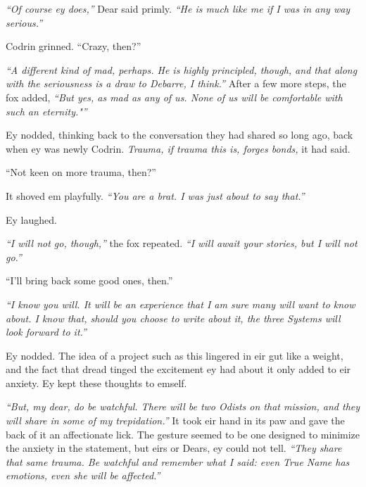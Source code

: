 \emph{``Of course ey does,''} Dear said primly. \emph{``He is much like me if I was in any way serious.''}

Codrin grinned. ``Crazy, then?''

\emph{``A different kind of mad, perhaps. He is highly principled, though, and that along with the seriousness is a draw to Debarre, I think.''} After a few more steps, the fox added, \emph{``But yes, as mad as any of us. None of us will be comfortable with such an eternity."''}

Ey nodded, thinking back to the conversation they had shared so long ago, back when ey was newly Codrin. \emph{Trauma, if trauma this is, forges bonds,} it had said.

``Not keen on more trauma, then?''

It shoved em playfully. \emph{``You are a brat. I was just about to say that.''}

Ey laughed.

\emph{``I will not go, though,''} the fox repeated. \emph{``I will await your stories, but I will not go.''}

``I'll bring back some good ones, then.''

\emph{``I know you will. It will be an experience that I am sure many will want to know about. I know that, should you choose to write about it, the three Systems will look forward to it.''}

Ey nodded. The idea of a project such as this lingered in eir gut like a weight, and the fact that dread tinged the excitement ey had about it only added to eir anxiety. Ey kept these thoughts to emself.

\emph{``But, my dear, do be watchful. There will be two Odists on that mission, and they will share in some of my trepidation.''} It took eir hand in its paw and gave the back of it an affectionate lick. The gesture seemed to be one designed to minimize the anxiety in the statement, but eirs or Dears, ey could not tell. \emph{``They share that same trauma. Be watchful and remember what I said: even True Name has emotions, even she will be affected.''}
